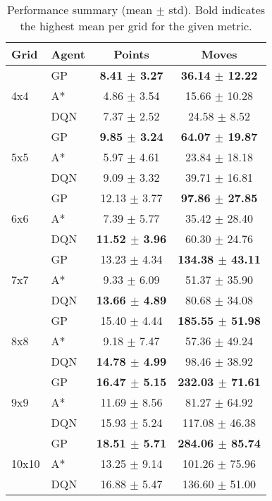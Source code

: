\documentclass[a4paper,12pt]{article}
\begin{document}
\begin{table}[H]
   \centering
   \caption{Performance summary (mean $\pm$ std). Bold indicates the highest mean per grid for the given metric.}
   \label{tab:performance_summary}
   \begin{tabular}{llcc}
      \toprule
      Grid & Agent & Points & Moves \\
      \midrule
      \multirow{3}{*}{4x4} & GP  & \textbf{8.41 $\pm$ 3.27} & \textbf{36.14 $\pm$ 12.22} \\
                                       & A*  & 4.86 $\pm$ 3.54 & 15.66 $\pm$ 10.28 \\
                                       & DQN & 7.37 $\pm$ 2.52 & 24.58 $\pm$ 8.52 \\
      \midrule
      \multirow{3}{*}{5x5} & GP  & \textbf{9.85 $\pm$ 3.24} & \textbf{64.07 $\pm$ 19.87} \\
                                       & A*  & 5.97 $\pm$ 4.61 & 23.84 $\pm$ 18.18 \\
                                       & DQN & 9.09 $\pm$ 3.32 & 39.71 $\pm$ 16.81 \\
      \midrule
      \multirow{3}{*}{6x6} & GP  & 12.13 $\pm$ 3.77 & \textbf{97.86 $\pm$ 27.85} \\
                                       & A*  & 7.39 $\pm$ 5.77 & 35.42 $\pm$ 28.40 \\
                                       & DQN & \textbf{11.52 $\pm$ 3.96} & 60.30 $\pm$ 24.76 \\
      \midrule
      \multirow{3}{*}{7x7} & GP  & 13.23 $\pm$ 4.34 & \textbf{134.38 $\pm$ 43.11} \\
                                       & A*  & 9.33 $\pm$ 6.09 & 51.37 $\pm$ 35.90 \\
                                       & DQN & \textbf{13.66 $\pm$ 4.89} & 80.68 $\pm$ 34.08 \\
      \midrule
      \multirow{3}{*}{8x8} & GP  & 15.40 $\pm$ 4.44 & \textbf{185.55 $\pm$ 51.98} \\
                                       & A*  & 9.18 $\pm$ 7.47 & 57.36 $\pm$ 49.24 \\
                                       & DQN & \textbf{14.78 $\pm$ 4.99} & 98.46 $\pm$ 38.92 \\
      \midrule
      \multirow{3}{*}{9x9} & GP  & \textbf{16.47 $\pm$ 5.15} & \textbf{232.03 $\pm$ 71.61} \\
                                       & A*  & 11.69 $\pm$ 8.56 & 81.27 $\pm$ 64.92 \\
                                       & DQN & 15.93 $\pm$ 5.24 & 117.08 $\pm$ 46.38 \\
      \midrule
      \multirow{3}{*}{10x10} & GP  & \textbf{18.51 $\pm$ 5.71} & \textbf{284.06 $\pm$ 85.74} \\
                                          & A*  & 13.25 $\pm$ 9.14 & 101.26 $\pm$ 75.96 \\
                                          & DQN & 16.88 $\pm$ 5.47 & 136.60 $\pm$ 51.00 \\
      \bottomrule
   \end{tabular}
\end{table}
\end{document}
